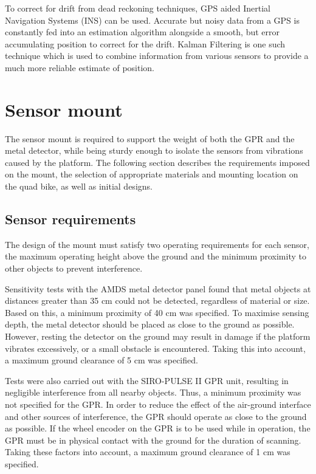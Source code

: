 \documentclass[main.tex]{subfiles}
\begin{document}
To correct for drift from dead reckoning techniques, GPS aided Inertial Navigation Systems (INS) can be used. Accurate but noisy data from a GPS is constantly fed into an estimation algorithm alongside a smooth, but error accumulating position to correct for the drift. Kalman Filtering is one such technique which is used to combine information from various sensors to provide a much more reliable estimate of position.
%

\section{Sensor mount}
The sensor mount is required to support the weight of both the GPR and the metal detector, while being sturdy enough to isolate the sensors from vibrations caused by the platform. The following section describes the requirements imposed on the mount, the selection of appropriate materials and mounting location on the quad bike, as well as initial designs.  

\subsection {Sensor requirements} 
The design of the mount must satisfy two operating requirements for each sensor, the maximum operating height above the ground and the minimum proximity to other objects to prevent interference. 

Sensitivity tests with the AMDS metal detector panel found that metal objects at distances greater than 35 cm could not be detected, regardless of material or size. Based on this, a minimum proximity of 40 cm was specified. To maximise sensing depth, the metal detector should be placed as close to the ground as possible. However, resting the detector on the ground may result in damage if the platform vibrates excessively, or a small obstacle is encountered. Taking this into account, a maximum ground clearance of 5 cm was specified.

Tests were also carried out with the SIRO-PULSE II GPR unit, resulting in negligible interference from all nearby  objects. Thus, a minimum proximity was not specified for the GPR. In order to reduce the effect of the air-ground interface and other sources of interference, the GPR should operate as close to the ground as possible. If the wheel encoder on the GPR is to be used while in operation, the GPR must be in physical contact with the ground for the duration of scanning. Taking these factors into account, a maximum ground clearance of 1 cm was specified. 
\end{document}
